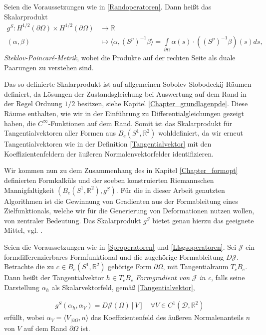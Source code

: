 \begin{defi}\label{Stek-Poi-metrik}
Seien die Voraussetzungen wie in \ref{Randoperatoren}. Dann heißt das Skalarprodukt
\begin{align*}
	g^S: H^{1/2}(\partial \Omega) \times H^{1/2}(\partial \Omega) &\rightarrow \mathbb{R} \\
	(\alpha,\beta) &\mapsto \langle \alpha, (S^p)^{-1}\beta \rangle = \underset{\partial \Omega}{\int} \alpha(s)\cdot((S^p)^{-1}\beta)(s)ds,
\end{align*}
\textit{Steklov-Poincaré-Metrik}, wobei die Produkte auf der rechten Seite als duale Paarungen zu verstehen sind. 
\end{defi}

Das so definierte Skalarprodukt ist auf allgemeinen Sobolev-Slobodeckij-Räumen definiert, da Lösungen der Zustandsgleichung bei Auswertung auf dem Rand in der Regel Ordnung $1/2$ besitzen, siehe Kapitel \ref{Chapter_grundlagenpde}. Diese Räume enthalten, wie wir in der Einführung zu Differentialgleichungen gezeigt haben, die $C^\infty$-Funktionen auf dem Rand. Somit ist das Skalarprodukt für Tangentialvektoren aller Formen aus $B_e(S^1, \mathbb{R}^2)$ wohldefiniert, da wir erneut Tangentialvektoren wie in der Definition \ref{Tangentialvektor} mit den Koeffizientenfeldern der äußeren Normalenvektorfelder identifizieren.

Wir kommen nun zu dem Zusammenhang des in Kapitel \ref{Chapter_formopt} definierten Formkalküls und der soeben konstruierten Riemannschen Mannigfaltigkeit $(B_e(S^1,\mathbb{R}^2),g^S)$.
Für die in dieser Arbeit genutzten Algorithmen ist die Gewinnung von Gradienten aus der Formableitung eines Zielfunktionals, welche wir für die Generierung von Deformationen nutzen wollen, von zentraler Bedeutung. Das Skalarprodukt $g^S$ bietet genau hierzu das geeignete Mittel, vgl. \cite{bfgs2}.

\begin{defi}[Formgradient]\label{Formgradientdefi}
Seien die Voraussetzungen wie in \ref{Sproperatoren} und \ref{Llsgsoperatoren}.
Sei $\mathcal{J}$ ein formdifferenzierbares Formfunktional und die zugehörige Formableitung $D\mathcal{J}$. Betrachte die zu $c\in B_e(S^1,\mathbb{R}^2)$ gehörige Form $\partial\Omega$, mit Tangentialraum $T_cB_e$. Dann heißt der Tangentialvektor $h\in T_cB_e$ \textit{Formgradient von} $\mathcal{J}$ \textit{in c}, falls seine Darstellung $\alpha_h$ als Skalarvektorfeld, gemäß \ref{Tangentialvektor}, 


\begin{align}\label{Gradientengleichung}
	g^S(\alpha_h, \alpha_V) = D\mathcal{J}(\Omega)[V] \quad \forall V\in C^1(\mathcal{D},\mathbb{R}^2)
\end{align}
erfüllt, wobei $\alpha_V = \langle V_{\vert \partial\Omega}, n\rangle$ das Koeffizientenfeld des äußeren Normalenanteils $n$ von $V$ auf dem Rand $\partial \Omega$ ist.

\end{defi}


